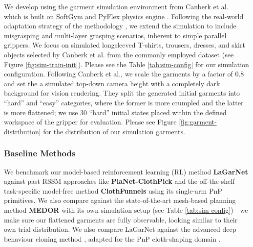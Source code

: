 \documentclass[journal]{IEEEtran}
\begin{document}
We develop  using the garment simulation environment from Canberk et al.~\cite{canberk2023cloth} which is built on SoftGym \cite{lin2020softgym} and PyFlex physics engine \cite{li2018learning}. Following the real-world adaptation strategy of the  methodology \cite{kadi2025draper}, we extend the simulation to include misgrasping and multi-layer grasping scenarios, inherent to simple parallel grippers. We focus on simulated longsleeved T-shirts, trousers, dresses, and skirt objects selected by Canberk et al. from the commonly employed  dataset \cite{bertiche2020cloth3d} (see Figure \ref{fig:sim-train-init}). Please see the Table \ref{tab:sim-config} for our simulation configuration. Following Canberk et al., we scale the garments by a factor of 0.8 and set the a simulated top-down camera height with a completely dark background for vision rendering. They split the generated initial garments into ``hard'' and ``easy'' categories, where the former is more crumpled and the latter is more flattened; we use 30 ``hard'' initial states placed within the defined workspace of the gripper for evaluation. Please see Figure \ref{fig:garment-distribution} for the distribution of our simulation garments.


\subsubsection{Baseline Methods} \label{sec:baseline} 

We benchmark our model-based reinforcement learning (RL) method \textbf{LaGarNet} against past RSSM approaches like \textbf{PlaNet-ClothPick} \cite{kadi2024planet} and the off-the-shelf task-specific model-free method \textbf{ClothFunnels} \cite{canberk2023cloth} using its single-arm PnP primitives. We also compare against the state-of-the-art mesh-based planning method \textbf{MEDOR} \cite{huang2022mesh}  with its own simulation setup (see Table \ref{tab:sim-config})---we make sure our flattened garments are fully observable, looking similar to their own trial distribution. We also compare LaGarNet against the advanced deep behaviour cloning method , adapted for the PnP cloth-shaping domain \cite{chi2023diffusionpolicy, kadi2025draper}.  
\end{document}
